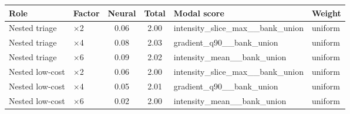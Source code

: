 \begin{tabular}{llccll}
\toprule
Role & Factor & Neural & Total & Modal score & Weight \\
\midrule
Nested triage & $\times$2 & 0.06 & 2.00 & intensity\_slice\_max\_\_bank\_union & uniform \\
Nested triage & $\times$4 & 0.08 & 2.03 & gradient\_q90\_\_bank\_union & uniform \\
Nested triage & $\times$6 & 0.09 & 2.02 & intensity\_mean\_\_bank\_union & uniform \\
Nested low-cost & $\times$2 & 0.06 & 2.00 & intensity\_slice\_max\_\_bank\_union & uniform \\
Nested low-cost & $\times$4 & 0.05 & 2.01 & gradient\_q90\_\_bank\_union & uniform \\
Nested low-cost & $\times$6 & 0.02 & 2.00 & intensity\_mean\_\_bank\_union & uniform \\
\bottomrule
\end{tabular}
